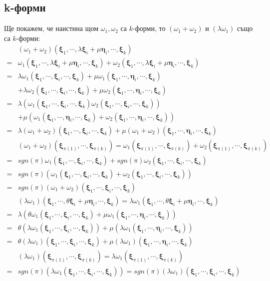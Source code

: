 \documentclass[12pt]{article}
\newcommand\myxi[0]{\boldsymbol{\xi}}
\newcommand\myeta[0]{\boldsymbol{\eta}}
\begin{document}
\begin{large}
\subsection{k-форми}
 Ще покажем, че наистина щом $\omega_1, \omega_2$ са $k$-форми, то $(\omega_1+\omega_2)$ и $(\lambda\omega_1)$ също са $k$-форми:
\begin{align*}
&(\omega_1+\omega_2)(\myxi_1,\cdots,\lambda\myxi_i+\mu\myeta_i,\cdots,\myxi_k) \\
=&\omega_1(\myxi_1,\cdots,\lambda\myxi_i+\mu\myeta_i,\cdots,\myxi_k)+\omega_2(\myxi_1,\cdots,\lambda\myxi_i+\mu\myeta_i,\cdots,\myxi_k) \\
=&\lambda\omega_1(\myxi_1,\cdots,\myxi_i,\cdots,\myxi_k)+\mu\omega_1(\myxi_1,\cdots,\myeta_i,\cdots,\myxi_k)\\
&+\lambda\omega_2(\myxi_1,\cdots,\myxi_i,\cdots,\myxi_k)+\mu\omega_2(\myxi_1,\cdots,\myeta_i,\cdots,\myxi_k) \\
=&\lambda(\omega_1(\myxi_1,\cdots,\myxi_i,\cdots,\myxi_k)\omega_2(\myxi_1,\cdots,\myxi_i,\cdots,\myxi_k))\\
&+\mu(\omega_1(\myxi_1,\cdots,\myeta_i,\cdots,\myxi_k)+\omega_2(\myxi_1,\cdots,\myeta_i,\cdots,\myxi_k)) \\
=&\lambda (\omega_1+\omega_2)(\myxi_1,\cdots,\myxi_i,\cdots,\myxi_k) + \mu (\omega_1+\omega_2)(\myxi_1,\cdots,\myeta_i,\cdots,\myxi_k) \\
&(\omega_1+\omega_2)(\myxi_{\pi(1)},\cdots,\myxi_{\pi(k)})=\omega_1(\myxi_{\pi(1)},\cdots,\myxi_{\pi(k)})+\omega_2(\myxi_{\pi(1)},\cdots,\myxi_{\pi(k)}) \\
=&sgn(\pi)\omega_1(\myxi_1,\cdots,\myxi_i,\cdots,\myxi_k)+sgn(\pi)\omega_2(\myxi_1,\cdots,\myxi_i,\cdots,\myxi_k) \\
=&sgn(\pi)(\omega_1(\myxi_1,\cdots,\myxi_i,\cdots,\myxi_k)+\omega_2(\myxi_1,\cdots,\myxi_i,\cdots,\myxi_k))\\
=&sgn(\pi)(\omega_1+\omega_2)(\myxi_1,\cdots,\myxi_i,\cdots,\myxi_k) \\
&(\lambda\omega_1)(\myxi_1,\cdots,\theta\myxi_i+\mu\myeta_i,\cdots,\myxi_k)=\lambda\omega_1(\myxi_1,\cdots,\theta\myxi_i+\mu\myeta_i,\cdots,\myxi_k) \\
=&\lambda(\theta\omega_1(\myxi_1,\cdots,\myxi_i,\cdots,\myxi_k)+\mu\omega_1(\myxi_1,\cdots,\myeta_i,\cdots,\myxi_k)) \\
=&\theta(\lambda\omega_1(\myxi_1,\cdots,\myxi_i,\cdots,\myxi_k))+\mu(\lambda\omega_1(\myxi_1,\cdots,\myeta_i,\cdots,\myxi_k)) \\
=&\theta(\lambda\omega_1)(\myxi_1,\cdots,\myxi_i,\cdots,\myxi_k)+\mu(\lambda\omega_1)(\myxi_1,\cdots,\myeta_i,\cdots,\myxi_k) \\
&(\lambda\omega_1)(\myxi_{\pi(1)},\cdots,\myxi_{\pi(k)})=\lambda\omega_1(\myxi_{\pi(1)},\cdots,\myxi_{\pi(k)}) \\
=&sgn(\pi)(\lambda\omega_1 (\myxi_1,\cdots,\myxi_i,\cdots,\myxi_k))=sgn(\pi)(\lambda\omega_1)(\myxi_1,\cdots,\myxi_i,\cdots,\myxi_k) \\
\end{align*}


\end{large}
\end{document}
